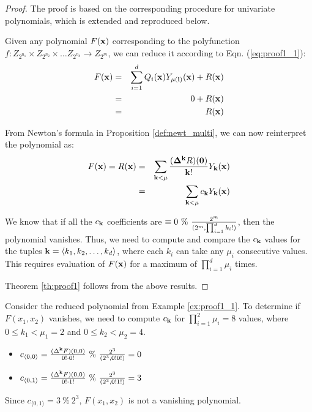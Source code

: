 \begin{proof}
The proof is based on the corresponding procedure for univariate
polynomials, which is extended and reproduced below. 

Given any polynomial $F({\bf x})$ corresponding to the polyfunction
$f:Z_{2^{n_1}} \times Z_{2^{n_2}} \times \ldots Z_{2^{n_d}}
\rightarrow Z_{2^m}$, we can reduce it according to Eqn. (\ref{eq:proof1_1}):
\begin{eqnarray}
F({\bf x}) &=&  \sum _{i=1}^d Q_i({\bf x}) Y_{{\bf \mu}(\textbf{i})}({\bf x}) + R({\bf x}) \nonumber \\
           &=& 0 + R({\bf x}) \nonumber \\
           &=& R({\bf x})
\end{eqnarray}

From Newton's formula in Proposition \ref{def:newt_multi}, we can now
reinterpret the polynomial as:
\begin{eqnarray}\label{eq:proof1_2}
F({\bf x}) = R({\bf x}) &=& \sum_{{\bf k} < {\bf \mu}}\frac{({\bf \Delta}^{{\bf
      k}}R)({\bf 0})}{\bf k!}Y_{\bf k}({\bf x}) \nonumber \\
                        &=& \sum_{{\bf k} < {\bf \mu}}c_{\bf k} Y_{\bf k}({\bf x})
\end{eqnarray}

We know that if all the $c_{\bf k}$ coefficients are $\equiv 0 ~\%
  ~{{2^m} \over {(2^m,\prod_{i=1}^d k_i!)}}$, then the polynomial
  vanishes. Thus, we need to compute and compare the $c_{\bf k}$
  values for the tuples ${\bf k} = \langle k_1, k_2, \ldots, k_d \rangle$, where
  each $k_i$ can take any $\mu_i$ consecutive values. This requires
  evaluation of $F({\bf x})$ for a maximum of $\prod_{i=1}^d \mu_i$ times.

Theorem \ref{th:proof1} follows from the above results.
\end{proof}

\begin{Example}\label{ex:proof1_2}
Consider the reduced polynomial from Example \ref{ex:proof1_1}. To
determine if $F(x_1, x_2)$ vanishes, we need to compute $c_{\bf k}$
for $\prod_{i=1}^2 \mu_i = 8$ values, where $0 \leq k_1 < \mu_1 = 2$
and $0 \leq k_2 < \mu_2 = 4$.
\begin{itemize}
\item $c_{\langle 0, 0\rangle} = \frac{(\Delta^{{\bf
      k}}F)(0,0)}{0! \cdot 0!} ~\% ~{{2^3} \over {(2^3, 0! 0!)}} = 0$
\item $c_{\langle 0, 1\rangle} = \frac{(\Delta^{{\bf
      k}}F)(0,0)}{0! \cdot 1!} ~\% ~{{2^3} \over {(2^3, 0!
      1!)}}  = 3$
\end{itemize}
Since $c_{\langle 0, 1\rangle} = 3 ~\% ~2^3$, $F(x_1, x_2)$ is not a
vanishing polynomial.
\end{Example}


